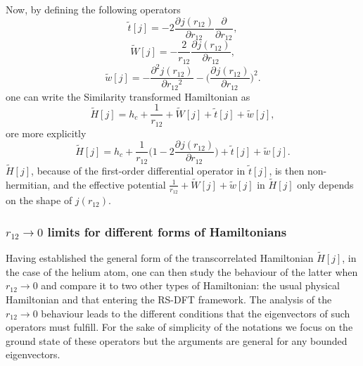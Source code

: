 \documentclass[aip,jcp,reprint,noshowkeys,superscriptaddress]{revtex4-1}
\newcommand{\deriv}[3]{\frac{\partial^{#3} #1}{\partial {#2}^{#3}}}
\begin{document}
Now, by defining the following operators 
\begin{equation}
 \label{eq:def_tt}
 \tilde{t}[j] = -2 \deriv{j(r_{12})}{r_{12}}{} \deriv{}{r_{12}}{},
\end{equation}
\begin{equation}
 \label{eq:def_wt}
 \tilde{W}[j] = -\frac{2}{r_{12}} \deriv{j(r_{12})}{r_{12}}{}  , 
\end{equation}
\begin{equation}
 \label{eq:def_wt}
 \tilde{w}[j] = -\deriv{j(r_{12})}{r_{12}}{2} - \bigg( \deriv{j(r_{12})}{r_{12}}{} \bigg)^2. 
\end{equation}
one can write the Similarity transformed Hamiltonian  as
\begin{equation}
 \label{eq:ht_phi}
 \tilde{H}[j] = h_c + \frac{1}{r_{12}}  + \tilde{W}[j] + \tilde{t}[j] + \tilde{w}[j] ,
\end{equation}
ore more explicitly 
\begin{equation}
 \tilde{H}[j] = h_c + \frac{1}{r_{12}}\bigg( 1 - 2 \deriv{j(r_{12})}{r_{12}}{}\bigg) + \tilde{t}[j] + \tilde{w}[j] .
\end{equation}
$\tilde{H}[j]$, because of the first-order differential operator in $\tilde{t}[j]$, is then non-hermitian,   
and the effective potential $ \frac{1}{r_{12}}  + \tilde{W}[j] + \tilde{w}[j]$ in $\tilde{H}[j]$ only depends on the shape of $j(r_{12})$. 

\subsubsection{$r_{12} \rightarrow 0$ limits for different forms of Hamiltonians}
\label{sec:cusp}
Having established the general form of the transcorrelated Hamiltonian $\tilde{H}[j]$, in the case of the helium atom, one can then study the behaviour of the latter when $r_{12}\rightarrow 0$ and compare it to two other types of Hamiltonian: the usual physical Hamiltonian and that entering the RS-DFT framework. 
The analysis of the $r_{12}\rightarrow 0$ behaviour leads to the different conditions that the eigenvectors of such operators must fulfill. For the sake of simplicity of the notations we focus on the ground state of these operators but the arguments are general for any bounded eigenvectors. 
\end{document}
